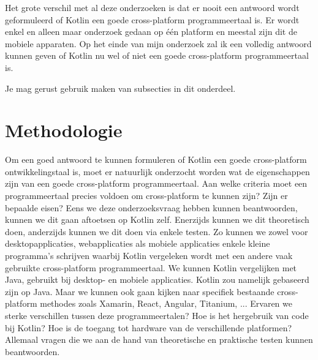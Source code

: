 \newline
\newline
Het grote verschil met al deze onderzoeken is dat er nooit een antwoord wordt geformuleerd of Kotlin een goede cross-platform programmeertaal is. Er wordt enkel en alleen maar onderzoek gedaan op één platform en meestal zijn dit de mobiele apparaten. Op het einde van mijn onderzoek zal ik een volledig antwoord kunnen geven of Kotlin nu wel of niet een goede cross-platform programmeertaal is. 


Je mag gerust gebruik maken van subsecties in dit onderdeel.

\section{Methodologie}
\label{sec:methodologie}

Om een goed antwoord te kunnen formuleren of Kotlin een goede cross-platform ontwikkelingstaal is, moet er natuurlijk onderzocht worden wat de eigenschappen zijn van een goede cross-platform programmeertaal. Aan welke criteria moet een programmeertaal precies voldoen om cross-platform te kunnen zijn? Zijn er bepaalde eisen?
\newline
\newline
Eens we deze onderzoeksvraag hebben kunnen beantwoorden, kunnen we dit gaan aftoetsen op Kotlin zelf. Enerzijds kunnen we dit theoretisch doen, anderzijds kunnen we dit doen via enkele testen. Zo kunnen we zowel voor desktopapplicaties, webapplicaties als mobiele applicaties enkele kleine programma's schrijven waarbij Kotlin vergeleken wordt met een andere vaak gebruikte cross-platform programmeertaal. We kunnen Kotlin vergelijken met Java, gebruikt bij desktop- en mobiele applicaties. Kotlin zou namelijk gebaseerd zijn op Java. Maar we kunnen ook gaan kijken naar specifiek bestaande cross-platform methodes zoals Xamarin, React, Angular, Titanium, ... Ervaren we sterke verschillen tussen deze programmeertalen? Hoe is het hergebruik van code bij Kotlin? Hoe is de toegang tot hardware van de verschillende platformen? Allemaal vragen die we aan de hand van theoretische en praktische testen kunnen beantwoorden.

